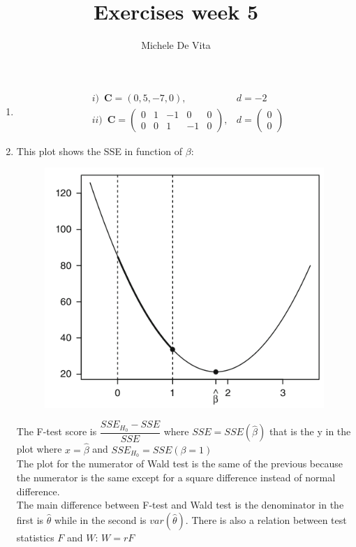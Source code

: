 \documentclass[10pt,a4paper]{article}
\author{Michele De Vita}
\title{Exercises week 5}
\begin{document}
	\maketitle
	\begin{enumerate}
		\item  
		\begin{align*}
	 &i) \,\,\, \mathbf{C} = (0,  5, -7, 0), &d = -2  \\
		& ii) \,\,\, \mathbf{C} = \left( \begin{matrix}
		0 & 1 & -1 & 0 & 0 \\ 
		0 & 0 & 1 & -1 & 0 
		\end{matrix} \right) ,  &d= \left( \begin{matrix}
		0 \\ 
		0
		\end{matrix} \right)
		\end{align*}
		\item 
		This plot shows the SSE in function of $ \beta $:
		\begin{figure}[H]
			\centering
			\includegraphics[width=0.7\linewidth]{plot_ftest}
		\end{figure}
		The F-test score is $ \dfrac{SSE_{H_0} - SSE}{SSE} $ where $ SSE = SSE(\hat{\beta}) $ that is the y in the plot where $ x = \hat{\beta} $ and $ SSE_{H_0} = SSE(\beta = 1) $\\
		The plot for the numerator of Wald test is the same of the previous because the numerator is the same except for a square difference instead of normal difference.\\
		The main difference between F-test and Wald test is the denominator in the first is $ \hat{\theta} $ while in the second is $ var(\hat{\theta}) $. There is also a relation between test statistics $ F $ and $ W $: $ W = rF $

\end{enumerate}
\end{document}
